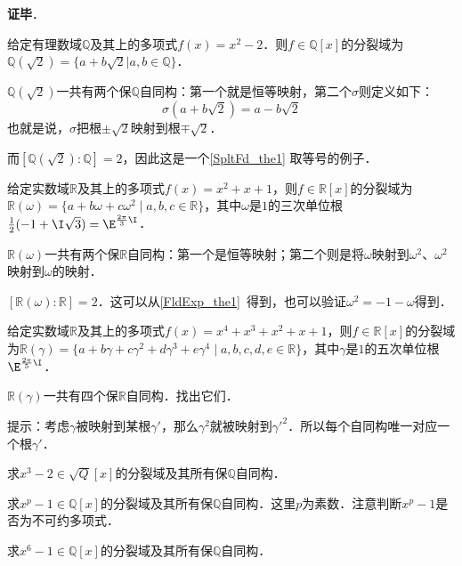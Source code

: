 \textbf{证毕}．





\begin{example}{}

给定有理数域$\mathbb{Q}$及其上的多项式$f(x)=x^2-2$．则$f\in\mathbb{Q}[x]$的分裂域为$\mathbb{Q}(\sqrt{2})=\{a+b\sqrt{2}|a, b\in\mathbb{Q}\}$．

$\mathbb{Q}(\sqrt{2})$一共有两个保$\mathbb{Q}$自同构：第一个就是恒等映射，第二个$\sigma$则定义如下：
\begin{equation}
\sigma(a+b\sqrt{2})=a-b\sqrt{2}
\end{equation}
也就是说，$\sigma$把根$\pm\sqrt{2}$映射到根$\mp\sqrt{2}$．


而$[\mathbb{Q}(\sqrt{2}):\mathbb{Q}]=2$，因此这是一个\autoref{SpltFd_the1} 取等号的例子．

\end{example}


\begin{example}{}
给定实数域$\mathbb{R}$及其上的多项式$f(x)=x^2+x+1$，则$f\in\mathbb{R}[x]$的分裂域为$\mathbb{R}(\omega)=\{a+b\omega+c\omega^2 \mid a, b, c\in\mathbb{R}\}$，其中$\omega$是$1$的三次单位根$\frac{1}{2}(-1+\I\sqrt{3})=\E^{\frac{2\pi}{3}\I}$．

$\mathbb{R}(\omega)$一共有两个保$\mathbb{R}$自同构：第一个是恒等映射；第二个则是将$\omega$映射到$\omega^2$、$\omega^2$映射到$\omega$的映射．

$[\mathbb{R}(\omega):\mathbb{R}]=2$．这可以从\autoref{FldExp_the1}~得到，也可以验证$\omega^2=-1-\omega$得到．
\end{example}



\begin{exercise}{}
给定实数域$\mathbb{R}$及其上的多项式$f(x)=x^4+x^3+x^2+x+1$，则$f\in\mathbb{R}[x]$的分裂域为$\mathbb{R}(\gamma)=\{a+b\gamma+c\gamma^2+d\gamma^3+e\gamma^4 \mid a, b, c, d, e\in\mathbb{R}\}$，其中$\gamma$是$1$的五次单位根$\E^{\frac{2\pi}{5}\I}$．

$\mathbb{R}(\gamma)$一共有四个保$\mathbb{R}$自同构．找出它们．

提示：考虑$\gamma$被映射到某根$\gamma'$，那么$\gamma^2$就被映射到$\gamma'^2$．所以每个自同构唯一对应一个根$\gamma'$．
\end{exercise}



\begin{exercise}{}
求$x^3-2\in\sqrt{Q}[x]$的分裂域及其所有保$\mathbb{Q}$自同构．
\end{exercise}



\begin{exercise}{}
求$x^p-1\in\mathbb{Q}[x]$的分裂域及其所有保$\mathbb{Q}$自同构．这里$p$为素数．注意判断$x^p-1$是否为不可约多项式．
\end{exercise}


\begin{exercise}{}
求$x^6-1\in\mathbb{Q}[x]$的分裂域及其所有保$\mathbb{Q}$自同构．
\end{exercise}














